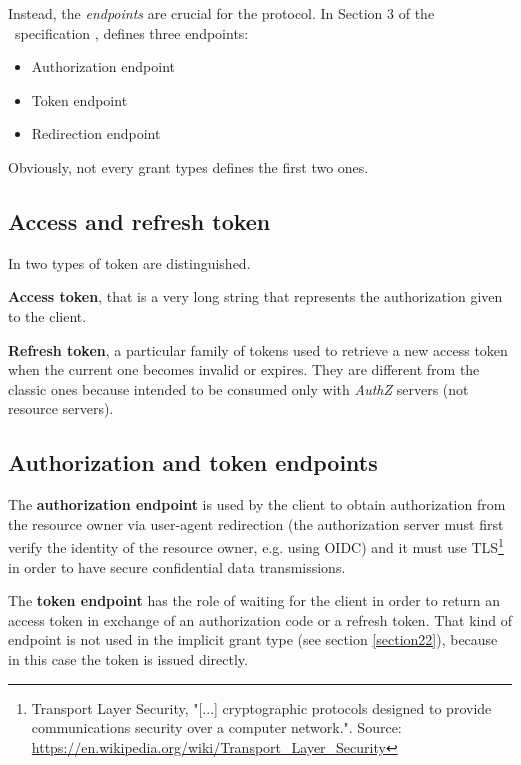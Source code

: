 Instead, the \textit{endpoints} are crucial for the protocol. In Section 3 of the \ specification \cite{RFC6749}, \textit{\oauth} defines three endpoints:

\begin{itemize}
    \item Authorization endpoint
    \item Token endpoint
    \item Redirection endpoint
\end{itemize}

Obviously, not every grant types defines the first two ones.

\subsection{Access and refresh token}
\label{accref}
In \textit{\oauth} two types of token are distinguished.

\textbf{Access token}, that is a very long string that represents the authorization given to the client.

\textbf{Refresh token}, a particular family of tokens used to retrieve a new access token when the current one becomes invalid or expires. They are different from the classic ones because intended to be consumed only with \textit{AuthZ} servers (not resource servers).


\subsection{Authorization and token endpoints}
The \textbf{authorization endpoint} is used by the client to obtain authorization from the resource owner via user-agent redirection (the authorization server must first verify the identity of the resource owner, e.g. using OIDC) and it must use TLS\footnote{Transport Layer Security, "[...] cryptographic protocols designed to provide communications security over a computer network.". Source: \url{https://en.wikipedia.org/wiki/Transport_Layer_Security}} in order to have secure confidential data transmissions.

The \textbf{token endpoint} has the role of waiting for the client in order to return an access token in exchange of an authorization code or a refresh token. That kind of endpoint is not used in the implicit grant type (see section \ref{section22}), because in this case the token is issued directly.

